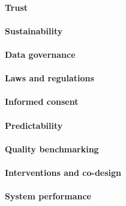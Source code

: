 \paragraph{Trust}

\paragraph{Sustainability}

\paragraph{Data governance}

\paragraph{Laws and regulations}

\paragraph{Informed consent}

\paragraph{Predictability}

\paragraph{Quality benchmarking}

\paragraph{Interventions and co-design}

\paragraph{System performance}





